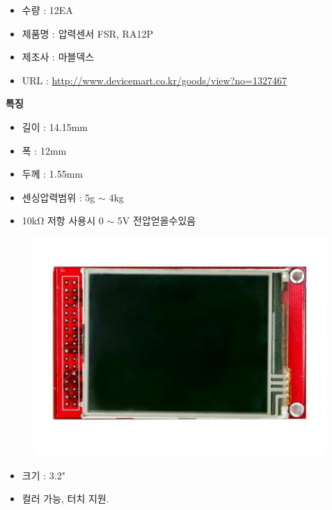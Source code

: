 \documentclass[a4paper, 11pt]{article}
\begin{document}
\begin{itemize}
\item 수량 : 12EA
\item 제품명 : 압력센서 FSR, RA12P
\item 제조사 : 마블덱스
\item URL : \url{http://www.devicemart.co.kr/goods/view?no=1327467}
\end{itemize}

\textbf{특징}
 
\begin{itemize}
\item 길이 : 14.15mm 
\item 폭 : 12mm
\item 두께 : 1.55mm 
\item 센싱압력범위 : 5g $\sim$ 4kg
\item 10k$\mathrm{\Omega}$ 저항 사용시 0 $\sim$ 5V 전압얻을수있음
\end{itemize}



\begin{figure}[h!]
\centering
\includegraphics[scale=0.7]{./Figure/CF4.png}
\end{figure}

\begin{itemize}
\item 크기 : 3.2" 
\item 컬러 가능, 터치 지원.
\end{itemize}
\end{document}
